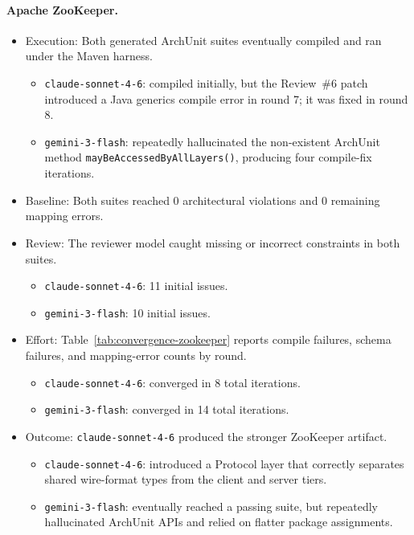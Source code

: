 \documentclass[sigconf,screen]{acmart}
\begin{document}
\paragraph{Apache ZooKeeper.}
\begin{itemize}
    \item Execution: Both generated ArchUnit suites eventually compiled and ran under the Maven harness.
    \begin{itemize}
        \item \texttt{claude-sonnet-4-6}: compiled initially, but the Review~\#6 patch introduced a Java generics compile error in round 7; it was fixed in round 8.
        \item \texttt{gemini-3-flash}: repeatedly hallucinated the non-existent ArchUnit method\newline
        \mbox{\texttt{mayBeAccessedByAllLayers()}}, producing four compile-fix iterations.
    \end{itemize}
    \item Baseline: Both suites reached 0 architectural violations and 0 remaining mapping errors.
    \item Review: The reviewer model caught missing or incorrect constraints in both suites.
    \begin{itemize}
        \item \texttt{claude-sonnet-4-6}: 11 initial issues.
        \item \texttt{gemini-3-flash}: 10 initial issues.
    \end{itemize}
    \item Effort: Table~\ref{tab:convergence-zookeeper} reports compile failures, schema failures, and mapping-error counts by round.
    \begin{itemize}
        \item \texttt{claude-sonnet-4-6}: converged in 8 total iterations.
        \item \texttt{gemini-3-flash}: converged in 14 total iterations.
    \end{itemize}
    \item Outcome: \texttt{claude-sonnet-4-6} produced the stronger ZooKeeper artifact.
    \begin{itemize}
        \item \texttt{claude-sonnet-4-6}: introduced a Protocol layer that correctly separates shared wire-format types from the client and server tiers.
        \item \texttt{gemini-3-flash}: eventually reached a passing suite, but repeatedly hallucinated ArchUnit APIs and relied on flatter package assignments.
    \end{itemize}
\end{itemize}
\end{document}
